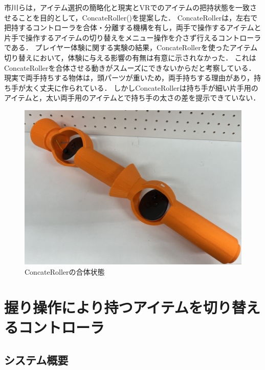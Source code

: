 \documentclass[uplatex]{jsarticle}
\begin{document}
市川らは，アイテム選択の簡略化と現実とVRでのアイテムの把持状態を一致させることを目的として，ConcateRoller()を提案した\cite{市川2025ConcateRoller}．
ConcateRollerは，左右で把持するコントローラを合体・分離する機構を有し，両手で操作するアイテムと片手で操作するアイテムの切り替えをメニュー操作を介さず行えるコントローラである．
プレイヤー体験に関する実験の結果，ConcateRollerを使ったアイテム切り替えにおいて，体験に与える影響の有無は有意に示されなかった．
これはConcateRollerを合体させる動きがスムーズにできないからだと考察している．
現実で両手持ちする物体は，頭パーツが重いため，両手持ちする理由があり，持ち手が太く丈夫に作られている．
しかしConcateRollerは持ち手が細い片手用のアイテムと，太い両手用のアイテムとで持ち手の太さの差を提示できていない．

\begin{figure}[htbp]
    \centering
    \includegraphics[width=0.9\linewidth]{fig/ConcateRoller合体.png}
    \caption{ConcateRollerの合体状態}
    \label{fig:ConcateRoller_concate}
\end{figure}

\section{握り操作により持つアイテムを切り替えるコントローラ}

\subsection{システム概要}
\end{document}
